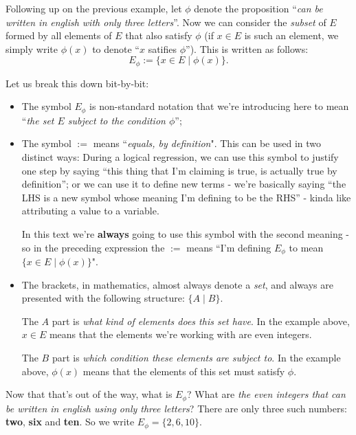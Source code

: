 \begin{ex}
	Following up on the previous example, let $\phi$ denote the proposition ``\textit{can be written in english with only three letters}''. Now we can consider the \textit{subset} of $E$ formed by all elements of $E$ that also satisfy $\phi$ (if $x\in E$ is such an element, we simply write $\phi(x)$ to denote ``$x$ satifies $\phi$''). This is written as follows:
	$$E_\phi:=\{x\in E\mid \phi(x)\}.$$
	
	Let us break this down bit-by-bit:
	\begin{itemize}
		\item The symbol $E_\phi$ is non-standard notation that we're introducing here to mean ``\textit{the set $E$ subject to the condition $\phi$}'';
		
		\item The symbol $:=$ means ``\textit{equals, by definition}". This can be used in two distinct ways: During a logical regression, we can use this symbol to justify one step by saying ``this thing that I'm claiming is true, is actually true by definition''; or we can use it to define new terms - we're basically saying ``the LHS is a new symbol whose meaning I'm defining to be the RHS'' - kinda like attributing a value to a variable.
		
		In this text we're \textbf{always} going to use this symbol with the second meaning - so in the preceding expression the $:=$ means ``I'm defining $E_\phi$ to mean $\{x\in E\mid \phi(x)\}$".
		
		\item The brackets, in mathematics, almost always denote a \textit{set}, and always are presented with the following structure: $\{A\mid B\}$.
		
		The $A$ part is \textit{what kind of elements does this set have}. In the example above, $x\in E$ means that the elements we're working with are even integers.
		
		The $B$ part is \textit{which condition these elements are subject to}. In the example above, $\phi(x)$ means that the elements of this set must satisfy $\phi$.
	\end{itemize}

Now that that's out of the way, what is $E_\phi$? What are \textit{the even integers that can be written in english using only three letters}? There are only three such numbers: \textbf{two}, \textbf{six} and \textbf{ten}. So we write $E_\phi=\{2,6,10\}$.
\end{ex}

